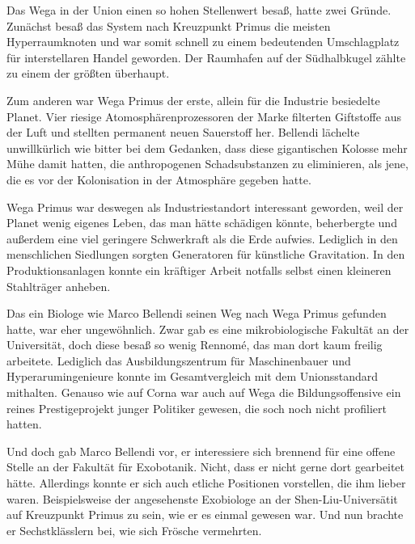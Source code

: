 \par

Das Wega in der Union einen so hohen Stellenwert besaß, hatte zwei Gründe. Zunächst besaß das System nach Kreuzpunkt Primus die meisten Hyperraumknoten und war somit schnell zu einem bedeutenden Umschlagplatz für interstellaren Handel geworden. Der Raumhafen auf der Südhalbkugel zählte zu einem der größten überhaupt.

\par

Zum anderen war Wega Primus der erste, allein für die Industrie besiedelte Planet. Vier riesige Atomosphärenprozessoren der Marke  filterten Giftstoffe aus der Luft und stellten permanent neuen Sauerstoff her. Bellendi lächelte unwillkürlich wie bitter bei dem Gedanken, dass diese gigantischen Kolosse mehr Mühe damit hatten, die anthropogenen Schadsubstanzen zu eliminieren, als jene, die es vor der Kolonisation in der Atmosphäre gegeben hatte.

\par

Wega Primus war deswegen als Industriestandort interessant geworden, weil der Planet wenig eigenes Leben, das man hätte schädigen könnte, beherbergte und außerdem eine viel geringere Schwerkraft als die Erde aufwies. Lediglich in den menschlichen Siedlungen sorgten Generatoren für künstliche Gravitation. In den Produktionsanlagen konnte ein kräftiger Arbeit notfalls selbst einen kleineren Stahlträger anheben.

\par

Das ein Biologe wie Marco Bellendi seinen Weg nach Wega Primus gefunden hatte, war eher ungewöhnlich. Zwar gab es eine mikrobiologische Fakultät an der Universität, doch diese besaß so wenig Rennomé, das man dort kaum freilig arbeitete. Lediglich das Ausbildungszentrum für Maschinenbauer und Hyperarumingenieure konnte im Gesamtvergleich mit dem Unionsstandard mithalten. Genauso wie auf Corna war auch auf Wega die Bildungsoffensive ein reines Prestigeprojekt junger Politiker gewesen, die soch noch nicht profiliert hatten.

\par

Und doch gab Marco Bellendi vor, er interessiere sich brennend für eine offene Stelle an der Fakultät für Exobotanik. Nicht, dass er nicht gerne dort gearbeitet hätte. Allerdings konnte er sich auch etliche Positionen vorstellen, die ihm lieber waren. Beispielsweise der angesehenste Exobiologe an der Shen-Liu-Universätit auf Kreuzpunkt Primus zu sein, wie er es einmal gewesen war. Und nun brachte er Sechstklässlern bei, wie sich Frösche vermehrten.

